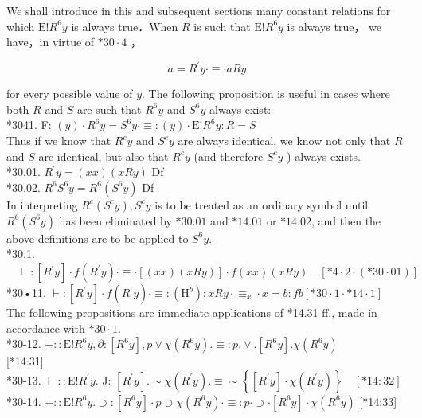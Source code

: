 \documentclass[10pt]{article}
\begin{document}
We shall introduce in this and subsequent sections many constant relations for which $\mathrm{E}!R^{6} y$ is always true．When $R$ is such that $\mathrm{E}!R^{6} y$ is always true， we have，in virtue of $* 30 \cdot 4$ ，

$$
a=R^{\prime} y \cdot \equiv \cdot a R y
$$

for every possible value of $y$. The following proposition is useful in cases where both $R$ and $S$ are such that $R^{6} y$ and $S^{6} y$ always exist:\\
*3041. F: $(y) \cdot R^{6} y=S^{6} y \cdot \equiv:(y) \cdot \mathrm{E}!R^{6} y: R=S$\\
Thus if we know that $R^{c} y$ and $S^{c} y$ are always identical, we know not only that $R$ and $S$ are identical, but also that $R^{c} y$ (and therefore $S^{c} y$ ) always exists.\\
*30.01. $R^{\prime} y=(x x)(x R y)$ Df\\
*30.02. $R^{6} S^{6} y=R^{6}\left(S^{6} y\right)$ Df\\
In interpreting $R^{c}\left(S^{c} y\right), S^{c} y$ is to be treated as an ordinary symbol until $R^{6}\left(S^{6} y\right)$ has been eliminated by $* 30.01$ and $* 14.01$ or $* 14.02$, and then the above definitions are to be applied to $S^{6} y$.\\
*30.1. $\quad \vdash:\left[R^{\prime} y\right] \cdot f\left(R^{\prime} y\right) \cdot \equiv \cdot[(x x)(x R y)] \cdot f(x x)(x R y) \quad[* 4 \cdot 2 \cdot(* 30 \cdot 01)]$\\
*30•11. $\vdash:\left[R^{\prime} y\right] \cdot f\left(R^{\prime} y\right) \cdot \equiv:\left(\mathrm{H}^{b}\right): x R y \cdot \equiv_{x} \cdot x=b: f b[* 30 \cdot 1 \cdot * 14 \cdot 1]$\\
The following propositions are immediate applications of *14.31 ff., made in accordance with $* 30 \cdot 1$.\\
*30-12. $+:: \mathrm{E}!R^{6} y, \partial:\left[R^{6} y\right], p \vee \chi\left(R^{6} y\right) . \equiv: p . \vee .\left[R^{6} y\right] . \chi\left(R^{6} y\right)$\\[0pt]
[*14:31]\\
*30-13. $\vdash:: \mathrm{E}!R^{\prime} y$. J: $\left[R^{\prime} y\right] . \sim \chi\left(R^{\prime} y\right) . \equiv \sim\left\{\left[R^{\prime} y\right] \cdot \chi\left(R^{\prime} y\right)\right\} \quad[* 14: 32]$\\
*30-14. $+:: \mathrm{E}!R^{6} y . \supset:\left[R^{6} y\right] \cdot p \supset \chi\left(R^{6} y\right) \cdot \equiv: p \cdot \supset \cdot\left[R^{6} y\right] \cdot \chi\left(R^{6} y\right)$ [*14:33]\\
\end{document}
